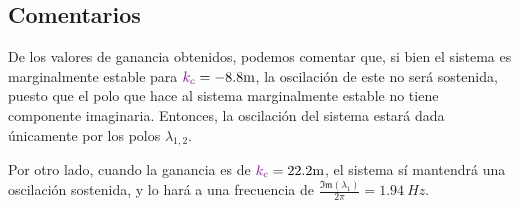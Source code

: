 \subsection{Comentarios}

De los valores de ganancia obtenidos, podemos comentar que, si bien el sistema
es marginalmente estable para $\mora{k_{c}} = -8.8\unit{m}$, la oscilación de
este no será sostenida, puesto que el polo que hace al sistema marginalmente
estable no tiene componente imaginaria. Entonces, la oscilación del sistema
estará dada únicamente por los polos $\lambda_{1,2}$.

Por otro lado, cuando la ganancia es de $\mora{k_{c}} = 22.2\unit{m}$, el
sistema sí mantendrá una oscilación sostenida, y lo hará a una frecuencia de
$\frac{\mathfrak{Im}(\lambda_{1})}{2\pi} = 1.94\ \unit{Hz}$.
